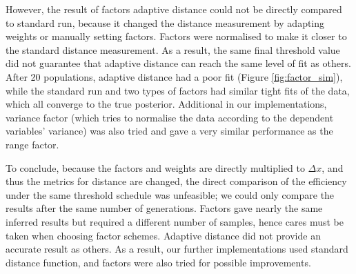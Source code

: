 However, the result of factors adaptive distance could not be directly compared to standard run, because it changed the distance measurement by adapting weights or manually setting factors. Factors were normalised to make it closer to the standard distance measurement. As a result, the same final threshold value did not guarantee that adaptive distance can reach the same level of fit as others. After 20 populations, adaptive distance had a poor fit (Figure \ref{fig:factor_sim}), while the standard run and two types of factors had similar tight fits of the data, which all converge to the true posterior. Additional in our implementations, variance factor (which tries to normalise the data according to the dependent variables' variance) was also tried and gave a very similar performance as the range factor.

To conclude, because the factors and weights are directly multiplied to $\Delta x$, and thus the metrics for distance are changed, the direct comparison of the efficiency under the same threshold schedule was unfeasible; we could only compare the results after the same number of generations. Factors gave nearly the same inferred results but required a different number of samples, hence cares must be taken when choosing factor schemes. Adaptive distance did not provide an accurate result as others. As a result, our further implementations used standard distance function, and factors were also tried for possible improvements.






